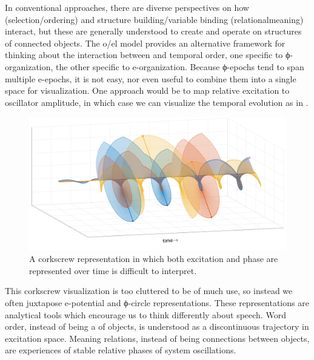   In conventional approaches, there are diverse perspectives on how  (selection/ordering) and structure building/variable binding (relational\linebreak meaning) interact, but these are generally understood to create and operate on structures of connected objects. The o/el model provides an alternative framework for thinking about the interaction between  and temporal order, one specific to ϕ-organization, the other specific to e-organization. Because ϕ-epochs tend to span multiple e-epochs, it is not easy, nor even useful to combine them into a single space for visualization. One approach would be to map relative excitation to oscillator amplitude, in which case we can visualize the temporal evolution as in {}.

  
\begin{figure}
\includegraphics[width=\textwidth]{figures/Tilsen-img28.png}
\caption{A corkscrew representation in which both excitation and phase are represented over time is difficult to interpret.}
\label{fig:2:21}
\end{figure}
 

  This corkscrew visualization is too cluttered to be of much use, so instead we often juxtapose e-potential and ϕ{}-circle representations. These representations are analytical tools which encourage us to think differently about speech. Word order, instead of being a  of objects, is understood as a discontinuous trajectory in excitation space. Meaning relations, instead of being connections between objects, are experiences of stable relative phases of system oscillations.

